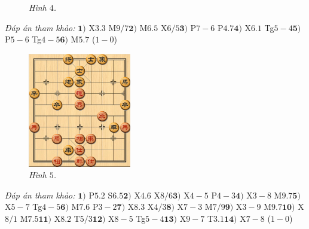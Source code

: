 \begin{multicols}{2}
\begin{figure}[H]
		\caption{\small\textit{\color{gocco}Hình $4$.}}
		\vspace*{-10pt}
	\end{figure}
	\textit{Đáp án tham khảo:} 
	\vskip 0.1cm
	$\pmb{1)}$ X$3.3$ M$9/7$\quad $\pmb{2)}$ M$6.5$ X$6/5$\quad $\pmb{3)}$ P$7-6$ P$4.7$\quad $\pmb{4)}$ X$6.1$  Tg$5-4$\quad  $\pmb{5)}$ P$5-6$ Tg$4-5$\quad $\pmb{6)}$ M$5.7$ ($1-0$)
	\vskip 0.1cm
	\begin{figure}[H]
		\vspace*{5pt}
		\centering
		\captionsetup{labelformat= empty, justification=centering}
		\includegraphics[width= 0.4\textwidth]{5}
		\caption{\small\textit{\color{gocco}Hình $5$.}}
		\vspace*{-10pt}
	\end{figure}
	\textit{Đáp án tham khảo:} 
	\vskip 0.1cm
	$\pmb{1)}$ P$5.2$ S$6.5$\quad $\pmb{2)}$ X$4.6$ X$8/6$\quad  $\pmb{3)}$ X$4-5$ P$4-3$\quad $\pmb{4)}$ X$3-8$  M$9.7$\quad  $\pmb{5)}$ X$5-7$ Tg$4-5$\quad $\pmb{6)}$ M$7.6$ P$3-2$\quad $\pmb{7)}$ X$8.3$ X$4/3$\quad $\pmb{8)}$ X$7-3$ M$7/9$\quad $\pmb{9)}$ X$3-9$ M$9.7$\quad $\pmb{10)}$ X$8/1$ M$7.5$\quad  $\pmb{11)}$ X$8.2$ T$5/3$\quad $\pmb{12)}$ X$8-5$ Tg$5-4$\quad $\pmb{13)}$ X$9-7$ T$3.1$\quad $\pmb{14)}$ X$7-8$  ($1-0$)
\end{multicols}




